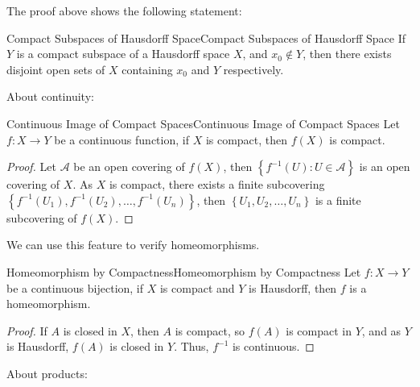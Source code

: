 \documentclass[../main.tex]{subfiles}
\begin{document}
The proof above shows the following statement:

\begin{lemma}{Compact Subspaces of Hausdorff Space}{Compact Subspaces of Hausdorff Space}
If $Y$ is a compact subspace of a Hausdorff space $X$, and $x_0\notin Y$, then there exists disjoint open sets of $X$ containing $x_0$ and $Y$ respectively.
\end{lemma}

About continuity:

\begin{theorem}{Continuous Image of Compact Spaces}{Continuous Image of Compact Spaces}
Let $f: X \rightarrow Y$ be a continuous function, if $X$ is compact, then $f(X)$ is compact.
\end{theorem}
\begin{proof}
	Let $\mathcal{A}$ be an open covering of $f(X)$, then $\left\{ f^{-1}(U): U\in \mathcal{A} \right\}$ is an open covering of $X$. As $X$ is compact, there exists a finite subcovering $\left\{ f^{-1}(U_1),f^{-1}(U_2),\ldots,f^{-1}(U_n) \right\}$, then $\left\{ U_1,U_2,\ldots,U_n \right\}$ is a finite subcovering of $f(X)$.
\end{proof}

We can use this feature to verify homeomorphisms.

\begin{theorem}{Homeomorphism by Compactness}{Homeomorphism by Compactness}
Let $f: X \rightarrow Y$ be a continuous bijection, if $X$ is compact and $Y$ is Hausdorff, then $f$ is a homeomorphism.
\end{theorem}
\begin{proof}
If $A$ is closed in $X$, then $A$ is compact, so $f(A)$ is compact in $Y$, and as $Y$ is Hausdorff, $f(A)$ is closed in $Y$. Thus, $f^{-1}$ is continuous.
\end{proof}

About products:
\end{document}
